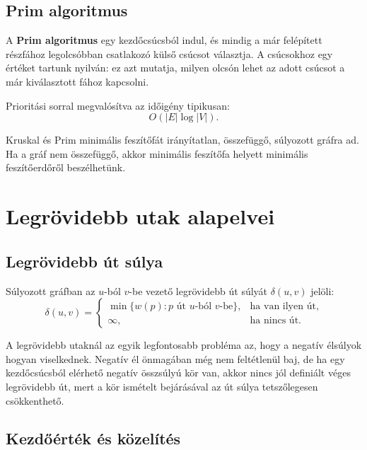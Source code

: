 \subsection{Prim algoritmus}

A \textbf{Prim algoritmus} egy kezdőcsúcsból indul, és mindig a már felépített részfához legolcsóbban csatlakozó külső csúcsot választja. A csúcsokhoz egy  értéket tartunk nyilván: ez azt mutatja, milyen olcsón lehet az adott csúcsot a már kiválasztott fához kapcsolni.


Prioritási sorral megvalósítva az időigény tipikusan:
\[
O(|E|\log |V|).
\]

\begin{center}

\end{center}

\begin{warningbox}
Kruskal és Prim minimális feszítőfát irányítatlan, összefüggő, súlyozott gráfra ad. Ha a gráf nem összefüggő, akkor minimális feszítőfa helyett minimális feszítőerdőről beszélhetünk.
\end{warningbox}

\section{Legrövidebb utak alapelvei}

\subsection{Legrövidebb út súlya}

Súlyozott gráfban az $u$-ból $v$-be vezető legrövidebb út súlyát $\delta(u,v)$ jelöli:
\[
\delta(u,v)=
\begin{cases}
\min\{w(p):p\text{ út }u\text{-ból }v\text{-be}\}, & \text{ha van ilyen út},\\
\infty, & \text{ha nincs út.}
\end{cases}
\]

A legrövidebb utaknál az egyik legfontosabb probléma az, hogy a negatív élsúlyok hogyan viselkednek. Negatív él önmagában még nem feltétlenül baj, de ha egy kezdőcsúcsból elérhető negatív összsúlyú kör van, akkor nincs jól definiált véges legrövidebb út, mert a kör ismételt bejárásával az út súlya tetszőlegesen csökkenthető.

\subsection{Kezdőérték és közelítés}

